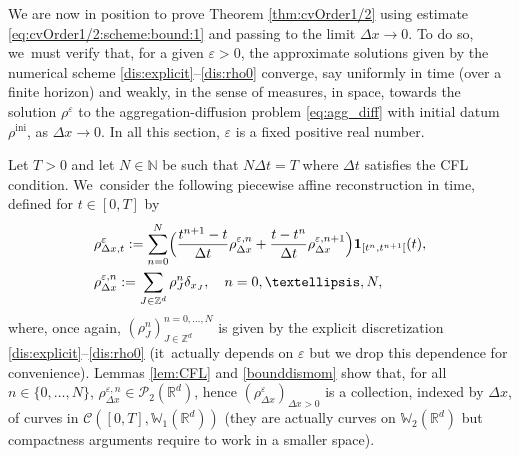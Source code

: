 \documentclass[11pt]{article}
\numberwithin{equation}{section}
\newcommand{\ini}{\mathrm{ini}}
\def\NN{\mathbb{N}}
\def\RR{\mathbb{R}}
\def\ZZ{\mathbb{Z}}
\def\WW{\mathbb{W}}
\def\eps{\varepsilon}
\def\dt{\Delta t}
\def\dx{\Delta x}
\def\calC{{\mathcal C}}
\def\calP{{\mathcal P}}
\theoremstyle{plain}
\theoremstyle{definition}
\begin{document}
We are now in position to prove Theorem \ref{thm:cvOrder1/2} using estimate \eqref{eq:cvOrder1/2:scheme:bound:1} and passing to the limit $\dx \to 0$. To do so, we~must verify that, for a given $\eps >0$, the approximate solutions given by the numerical scheme \eqref{dis:explicit}--\eqref{dis:rho0} converge, say uniformly in time (over a finite horizon) and weakly, in the sense of measures, in space, towards the solution $\rho^\eps$ to the aggregation-diffusion problem \eqref{eq:agg_diff} with initial datum $\rho^{\ini}$, as $\dx \to 0$. In all this section, $\eps$ is a fixed positive real number.

Let $T > 0$ and let $N \in \NN$ be such that $N\dt = T$ where $\Delta t$ satisfies the CFL condition. We~consider the following piecewise affine reconstruction in time, defined for $t \in [0,T]$ by
\begin{subequations}
\begin{align}
& \rho_{\dx, t}^{\eps} := \sum_{n=0}^N \Bigl(\frac{t^{n+1} - t}{\dt} \rho_{\dx}^{\eps,n} + \frac{t-t^n}{\dt}\rho_{\dx}^{\eps,n+1}\Bigr) {\mathbf 1}_{[t^n, t^{n+1}[}(t), \label{rhoaff}\\
& \rho_{\dx}^{\eps,n} := \sum_{J\in \ZZ^d} \rho_J^n \delta_{x_J}, \quad n = 0, \ldots, N,
\end{align}
\end{subequations}
where, once again, $(\rho_J^n)_{J\in\ZZ^d}^{n=0,\ldots,N}$ is given by the explicit discretization \eqref{dis:explicit}--\eqref{dis:rho0} (it~actually depends on $\eps$ but we drop this dependence for convenience). Lemmas \ref{lem:CFL} and \ref{bounddismom} show that, for all $n \in \{0,\ldots,N\}$, $\rho_{\dx}^{\eps,n} \in \calP_2(\RR^d)$, hence $(\rho_{\dx}^\eps)_{\dx > 0}$ is a collection, indexed by $\dx$, of curves in $\calC([0,T], \WW_1(\RR^d))$ (they are actually curves on $\WW_2(\RR^d)$ but compactness arguments require to work in a smaller space).
\end{document}
